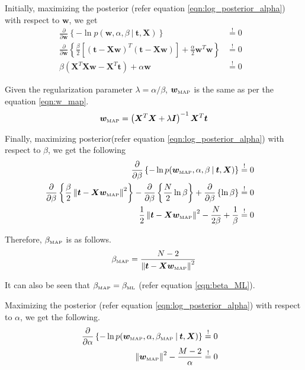 \documentclass[11pt]{article}
\newcommand{\eye}{\bm{I}}
\newcommand{\mle}[1]{{#1}_{\text{\tiny ML}}}
\newcommand{\map}[1]{{#1}_{\text{\tiny MAP}}}
\newcommand\given[1][]{\:#1\vert\:}
\newcommand{\norm}[1]{\left\lVert#1\right\rVert}
\begin{document}
Initially, maximizing the posterior (refer equation \ref{eqn:log_posterior_alpha}) with respect to $\bm{w}$, we get
\begin{eqnarray}
    \frac{\partial }{\partial  \bm{w}} \left\{ -\ln{p(\bm{w}, \alpha, \beta \given \bm{t}, \bm{X})} \right\} 
    &\overset{!}{=} 0& \\
    \frac{\partial }{\partial \bm{w}} \left\{\frac{\beta}{2} \left[ \left(\bm{t} - \bm{X}\bm{w}\right)^T \left(\bm{t} - \bm{X}\bm{w}\right)\right] + \frac{\alpha}{2}\bm{w}^T\bm{w}\right\}
    &\overset{!}{=} 0& \\
    \beta \left( \bm{X}^T\bm{X}\bm{w} - \bm{X}^T \bm{t} \right) + \alpha\bm{w}
    &\overset{!}{=} 0& 
\end{eqnarray}

Given the regularization parameter $\lambda = \alpha/\beta$, $\map{\bm{w}}$ is the same as per the equation \ref{eqn:w_map}.
\begin{equation}
    \map{\bm{w}} = \left(\bm{X}^T\bm{X} + \lambda\eye\right)^{-1}\bm{X}^T\bm{t}
\end{equation}

Finally, maximizing posterior(refer equation \ref{eqn:log_posterior_alpha}) with respect to $\beta$, we get the following
\begin{eqnarray}
    \frac{\partial }{\partial  \beta} \left\{ -\ln{p(\map{\bm{w}}, \alpha, \beta \given \bm{t}, \bm{X})} \right\} 
    &\overset{!}{=} 0& \\
    \frac{\partial }{\partial \beta} \left\{\frac{\beta}{2} \norm{\bm{t} - \bm{X}\map{\bm{w}}}^2 \right\}
    - \frac{\partial }{\partial \beta} \left\{\frac{N}{2}\ln{\beta} \right\} + \frac{\partial }{\partial \beta} \left\{ \ln{\beta} \right\}
    &\overset{!}{=} 0& \\
    \frac{1}{2} \norm{\bm{t} - \bm{X}\map{\bm{w}}}^2 - \frac{N}{2\beta} + \frac{1}{\beta}
    &\overset{!}{=} 0&
\end{eqnarray}

Therefore, $\map{\beta}$ is as follows.
\begin{equation}
    \map{\beta} = \frac{N-2}{\norm{\bm{t} - \bm{X}\map{\bm{w}}}^2}
\end{equation}

It can also be seen that $\map{\beta} = \mle{\beta}$ (refer equation \ref{eqn:beta_ML}).

Maximizing the posterior (refer equation \ref{eqn:log_posterior_alpha}) with respect to $\alpha$, we get the following.
\begin{eqnarray}
    \frac{\partial }{\partial  \alpha} \left\{ -\ln{p(\map{\bm{w}}, \alpha, \map{\beta} \given \bm{t}, \bm{X})} \right\}
    &\overset{!}{=} 0&  \\
    \norm{\map{\bm{w}}}^2 - \frac{M-2}{\alpha}
    &\overset{!}{=} 0& 
\end{eqnarray}
\end{document}
